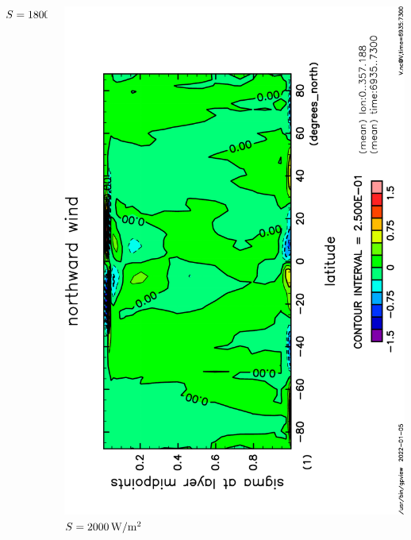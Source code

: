 \documentclass[aspectratio=149,9pt,fleqn]{beamer}
\begin{document}
\begin{frame}
\begin{columns}[T]
\begin{column}{.3\textwidth}
			\(S=1800\hmu{W/m^2}\)
		\end{column}
		\begin{column}{.3\textwidth}
			\centering
			\includegraphics[height=\textwidth,angle=-90]{S2000/V,time=6935:7300-crop.pdf}
			\(S=2000\hmu{W/m^2}\)
		\end{column}
	\end{columns}
\end{frame}
\end{document}
